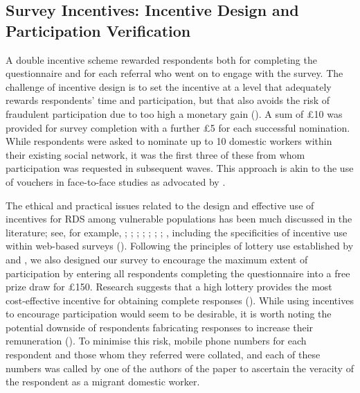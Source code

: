 \documentclass[
  12pt,
  letterpaper,
  DIV=11,
  numbers=noendperiod]{scrartcl}
\theoremstyle{plain}
\theoremstyle{definition}
\begin{document}
\subsection{Survey Incentives: Incentive Design and Participation
Verification}\label{survey-incentives-incentive-design-and-participation-verification}

A double incentive scheme rewarded respondents both for completing the
questionnaire and for each referral who went on to engage with the
survey. The challenge of incentive design is to set the incentive at a
level that adequately rewards respondents' time and participation, but
that also avoids the risk of fraudulent participation due to too high a
monetary gain (\textcite{jordan_overcoming_2020}). A sum of £10 was
provided for survey completion with a further £5 for each successful
nomination. While respondents were asked to nominate up to 10 domestic
workers within their existing social network, it was the first three of
these from whom participation was requested in subsequent waves. This
approach is akin to the use of vouchers in face-to-face studies as
advocated by \textcite{thompson_new_2020}.

The ethical and practical issues related to the design and effective use
of incentives for RDS among vulnerable populations has been much
discussed in the literature; see, for example,
\textcite{wang_respondent-driven_2005};
\textcite{abdul-quader_effectiveness_2006};
\textcite{singer_incentives_2006}; \textcite{dejong_ethical_2009};
\textcite{semaan_ethical_2009}; \textcite{brunovskis_untold_2010};
\textcite{semaan_time-space_2010}; \textcite{platt_adapting_2015},
including the specificities of incentive use within web-based surveys
(\textcite{cobanoglu_effect_2003}). Following the principles of lottery
use established by \textcite{brown_you_2006} and
\textcite{laguilles_can_2011}, we also designed our survey to encourage
the maximum extent of participation by entering all respondents
completing the questionnaire into a free prize draw for £150. Research
suggests that a high lottery provides the most cost-effective incentive
for obtaining complete responses
(\textcite{gajic_cost-effectiveness_2012}). While using incentives to
encourage participation would seem to be desirable, it is worth noting
the potential downside of respondents fabricating responses to increase
their remuneration (\textcite{robinson_sampling_2014}). To minimise this
risk, mobile phone numbers for each respondent and those whom they
referred were collated, and each of these numbers was called by one of
the authors of the paper to ascertain the veracity of the respondent as
a migrant domestic worker.
\end{document}
